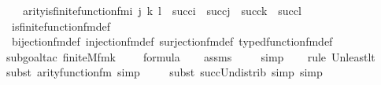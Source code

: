 \begin{isabellebody}
\ \ \ {\isachardoublequoteopen}arity{\isacharparenleft}{\kern0pt}is{\isacharunderscore}{\kern0pt}finite{\isacharunderscore}{\kern0pt}function{\isacharunderscore}{\kern0pt}fm{\isacharparenleft}{\kern0pt}i{\isacharcomma}{\kern0pt}\ j{\isacharcomma}{\kern0pt}\ k{\isacharcomma}{\kern0pt}\ l{\isacharparenright}{\kern0pt}{\isacharparenright}{\kern0pt}\ {\isasymle}\ succ{\isacharparenleft}{\kern0pt}i{\isacharparenright}{\kern0pt}\ {\isasymunion}\ succ{\isacharparenleft}{\kern0pt}j{\isacharparenright}{\kern0pt}\ {\isasymunion}\ succ{\isacharparenleft}{\kern0pt}k{\isacharparenright}{\kern0pt}\ {\isasymunion}\ succ{\isacharparenleft}{\kern0pt}l{\isacharparenright}{\kern0pt}{\isachardoublequoteclose}\ \isanewline
%
\isadelimproof
\ \ %
\endisadelimproof
%
\isatagproof
{}\isamarkupfalse%
\ is{\isacharunderscore}{\kern0pt}finite{\isacharunderscore}{\kern0pt}function{\isacharunderscore}{\kern0pt}fm{\isacharunderscore}{\kern0pt}def\ \isanewline
\ \ \isamarkupfalse%
\ bijection{\isacharunderscore}{\kern0pt}fm{\isacharunderscore}{\kern0pt}def\ injection{\isacharunderscore}{\kern0pt}fm{\isacharunderscore}{\kern0pt}def\ surjection{\isacharunderscore}{\kern0pt}fm{\isacharunderscore}{\kern0pt}def\ typed{\isacharunderscore}{\kern0pt}function{\isacharunderscore}{\kern0pt}fm{\isacharunderscore}{\kern0pt}def\isanewline
\ \ \isamarkupfalse%
{\isacharparenleft}{\kern0pt}subgoal{\isacharunderscore}{\kern0pt}tac\ {\isachardoublequoteopen}finite{\isacharunderscore}{\kern0pt}M{\isacharunderscore}{\kern0pt}fm{\isacharparenleft}{\kern0pt}k\ {\isacharhash}{\kern0pt}{\isacharplus}{\kern0pt}\ {}{\isacharcomma}{\kern0pt}\ {}{\isacharparenright}{\kern0pt}\ {\isasymin}\ formula{\isachardoublequoteclose}{\isacharparenright}{\kern0pt}\isanewline
\ \ \isamarkupfalse%
\ assms\isanewline
\ \ \ \isamarkupfalse%
\ simp\isanewline
\ \ \ \isamarkupfalse%
{\isacharparenleft}{\kern0pt}rule\ Un{\isacharunderscore}{\kern0pt}least{\isacharunderscore}{\kern0pt}lt{\isacharparenright}{\kern0pt}\isanewline
\ \ \ \ \isamarkupfalse%
{\isacharparenleft}{\kern0pt}subst\ arity{\isacharunderscore}{\kern0pt}function{\isacharunderscore}{\kern0pt}fm{\isacharcomma}{\kern0pt}\ simp{\isacharparenright}{\kern0pt}\isanewline
\ \ \ \ \isamarkupfalse%
{\isacharparenleft}{\kern0pt}subst\ succ{\isacharunderscore}{\kern0pt}Un{\isacharunderscore}{\kern0pt}distrib{\isacharcomma}{\kern0pt}\ simp{\isacharcomma}{\kern0pt}\ simp{\isacharparenright}{\kern0pt}{\isacharplus}{\kern0pt}\isanewline

\end{isabellebody}
